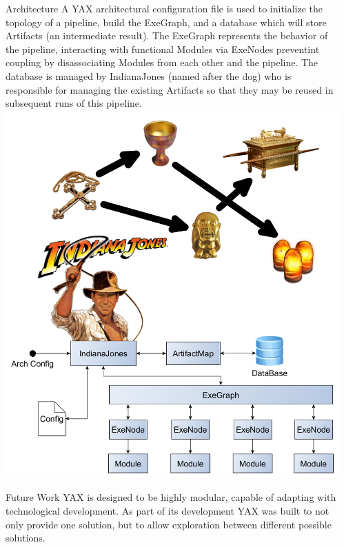 \documentclass[final,t]{beamer}
\begin{document}
\begin{frame}{}
\begin{columns}[t]
\begin{column}{.3\linewidth}
    \end{column}


    \begin{column}{.3\linewidth}
        \begin{block}{Architecture}
            A YAX architectural configuration file is used to initialize the topology of a pipeline, build the
            ExeGraph, and a database which will store Artifacts (an intermediate result).
            The ExeGraph represents the behavior of the pipeline, interacting with functional Modules via ExeNodes preventint
            coupling by disassociating Modules from each other and the pipeline. The database is managed by IndianaJones
            (named after the dog) who is responsible for managing the existing
            Artifacts so that they may be reused in subsequent runs of this pipeline. \newline
            \includegraphics[width=1\linewidth]{assets/arch}
        \end{block}

        \begin{block}{Future Work}
            YAX is designed to be highly modular, capable of adapting with technological development. As part of its development
            YAX was built to not only provide one solution, but to allow exploration between different possible solutions.


\end{block}
\end{column}
\end{columns}
\end{frame}
\end{document}
